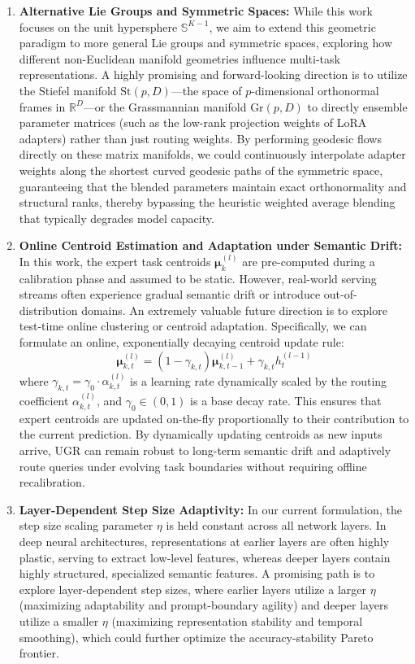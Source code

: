 \begin{enumerate}
    \item \textbf{Alternative Lie Groups and Symmetric Spaces:} While this work focuses on the unit hypersphere $\mathbb{S}^{K-1}$, we aim to extend this geometric paradigm to more general Lie groups and symmetric spaces, exploring how different non-Euclidean manifold geometries influence multi-task representations. A highly promising and forward-looking direction is to utilize the Stiefel manifold $\text{St}(p, D)$—the space of $p$-dimensional orthonormal frames in $\mathbb{R}^D$—or the Grassmannian manifold $\text{Gr}(p, D)$ to directly ensemble parameter matrices (such as the low-rank projection weights of LoRA adapters) rather than just routing weights. By performing geodesic flows directly on these matrix manifolds, we could continuously interpolate adapter weights along the shortest curved geodesic paths of the symmetric space, guaranteeing that the blended parameters maintain exact orthonormality and structural ranks, thereby bypassing the heuristic weighted average blending that typically degrades model capacity.
    \item \textbf{Online Centroid Estimation and Adaptation under Semantic Drift:} In this work, the expert task centroids $\boldsymbol{\mu}_k^{(l)}$ are pre-computed during a calibration phase and assumed to be static. However, real-world serving streams often experience gradual semantic drift or introduce out-of-distribution domains. An extremely valuable future direction is to explore test-time online clustering or centroid adaptation. Specifically, we can formulate an online, exponentially decaying centroid update rule:
    \begin{equation}
    \boldsymbol{\mu}_{k, t}^{(l)} = (1 - \gamma_{k,t})\boldsymbol{\mu}_{k, t-1}^{(l)} + \gamma_{k,t} h_t^{(l-1)}
    \end{equation}
    where $\gamma_{k,t} = \gamma_0 \cdot \alpha_{k, t}^{(l)}$ is a learning rate dynamically scaled by the routing coefficient $\alpha_{k, t}^{(l)}$, and $\gamma_0 \in (0, 1)$ is a base decay rate. This ensures that expert centroids are updated on-the-fly proportionally to their contribution to the current prediction. By dynamically updating centroids as new inputs arrive, UGR can remain robust to long-term semantic drift and adaptively route queries under evolving task boundaries without requiring offline recalibration.
    \item \textbf{Layer-Dependent Step Size Adaptivity:} In our current formulation, the step size scaling parameter $\eta$ is held constant across all network layers. In deep neural architectures, representations at earlier layers are often highly plastic, serving to extract low-level features, whereas deeper layers contain highly structured, specialized semantic features. A promising path is to explore layer-dependent step sizes, where earlier layers utilize a larger $\eta$ (maximizing adaptability and prompt-boundary agility) and deeper layers utilize a smaller $\eta$ (maximizing representation stability and temporal smoothing), which could further optimize the accuracy-stability Pareto frontier.
\end{enumerate}

